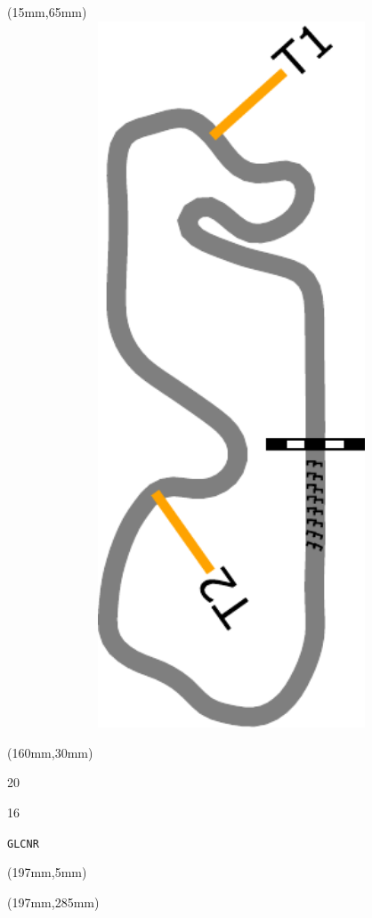 \begin{textblock*}{185mm}(15mm,65mm)%
\centering
\mbox{\includegraphics[width=185mm,height=210mm,keepaspectratio]{PT/GLCNR.pdf}}
\end{textblock*}
\begin{textblock*}{40mm}(160mm,30mm)%
\Large
\par{} 
\par20 
\par16 
\par\hfill\tiny\tt GLCNR\\
\end{textblock*}
\begin{textblock*}{20mm}(197mm,5mm)%
\fbox{\thepage}
\label{GLCNR}
\end{textblock*}
\begin{textblock*}{20mm}(197mm,285mm)%
\fbox{\thepage}
\end{textblock*}

